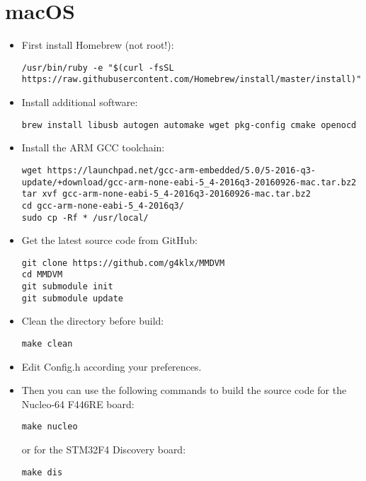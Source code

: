 \documentclass[]{article}
\begin{document}
\section{macOS}

\begin{itemize}[leftmargin=*]
	
\item First install Homebrew (not root!):
\begin{lstlisting}[style=DOS]
/usr/bin/ruby -e "$(curl -fsSL https://raw.githubusercontent.com/Homebrew/install/master/install)"
\end{lstlisting}

\item Install additional software:
\begin{lstlisting}[style=DOS]
brew install libusb autogen automake wget pkg-config cmake openocd
\end{lstlisting}

\item Install the ARM GCC toolchain:
\begin{lstlisting}[style=DOS]
wget https://launchpad.net/gcc-arm-embedded/5.0/5-2016-q3-update/+download/gcc-arm-none-eabi-5_4-2016q3-20160926-mac.tar.bz2
tar xvf gcc-arm-none-eabi-5_4-2016q3-20160926-mac.tar.bz2
cd gcc-arm-none-eabi-5_4-2016q3/
sudo cp -Rf * /usr/local/
\end{lstlisting}

\item Get the latest source code from GitHub:
\begin{lstlisting}[style=DOS]
git clone https://github.com/g4klx/MMDVM
cd MMDVM
git submodule init
git submodule update
\end{lstlisting}

\item Clean the directory before build:
\begin{lstlisting}[style=DOS]
make clean
\end{lstlisting}

\item Edit Config.h according your preferences.

\item Then you can use the following commands to build the source code for the Nucleo-64 F446RE board:
\begin{lstlisting}[style=DOS]
make nucleo
\end{lstlisting}

or for the STM32F4 Discovery board:
\begin{lstlisting}[style=DOS]
make dis
\end{lstlisting}


\end{itemize}
\end{document}
